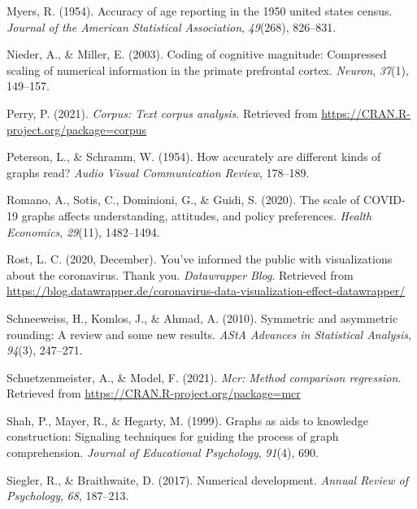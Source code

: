 \documentclass[print]{nuthesis}
\newlength{\cslhangindent}
\newenvironment{CSLReferences}[2]%
{\setlength{\parindent}{0pt}%
\everypar{\setlength{\hangindent}{\cslhangindent}}\ignorespaces}%
{\par}
\begin{document}
\begin{CSLReferences}{1}{0}
\leavevmode{}%
Myers, R. (1954). Accuracy of age reporting in the 1950 united states census. \emph{Journal of the American Statistical Association}, \emph{49}(268), 826--831.

\leavevmode{}%
Nieder, A., \& Miller, E. (2003). Coding of cognitive magnitude: Compressed scaling of numerical information in the primate prefrontal cortex. \emph{Neuron}, \emph{37}(1), 149--157.

\leavevmode{}%
Perry, P. (2021). \emph{Corpus: Text corpus analysis}. Retrieved from \url{https://CRAN.R-project.org/package=corpus}

\leavevmode{}%
Peterson, L., \& Schramm, W. (1954). How accurately are different kinds of graphs read? \emph{Audio Visual Communication Review}, 178--189.

\leavevmode{}%
Romano, A., Sotis, C., Dominioni, G., \& Guidi, S. (2020). The scale of COVID-19 graphs affects understanding, attitudes, and policy preferences. \emph{Health Economics}, \emph{29}(11), 1482--1494.

\leavevmode{}%
Rost, L. C. (2020, December). You've informed the public with visualizations about the coronavirus. Thank you. \emph{Datawrapper Blog}. Retrieved from \url{https://blog.datawrapper.de/coronavirus-data-visualization-effect-datawrapper/}

\leavevmode{}%
Schneeweiss, H., Komlos, J., \& Ahmad, A. (2010). Symmetric and asymmetric rounding: A review and some new results. \emph{AStA Advances in Statistical Analysis}, \emph{94}(3), 247--271.

\leavevmode{}%
Schuetzenmeister, A., \& Model, F. (2021). \emph{Mcr: Method comparison regression}. Retrieved from \url{https://CRAN.R-project.org/package=mcr}

\leavevmode{}%
Shah, P., Mayer, R., \& Hegarty, M. (1999). Graphs as aids to knowledge construction: Signaling techniques for guiding the process of graph comprehension. \emph{Journal of Educational Psychology}, \emph{91}(4), 690.

\leavevmode{}%
Siegler, R., \& Braithwaite, D. (2017). Numerical development. \emph{Annual Review of Psychology}, \emph{68}, 187--213.


\end{CSLReferences}
\end{document}
